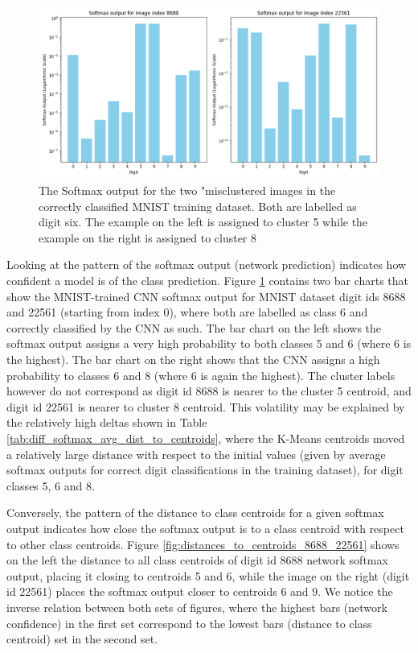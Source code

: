 \begin{figure}[H]
    \centering
    \includegraphics[width=0.99\columnwidth]{Figures/8688_22561_Softmax_Output.png}
    \caption{The Softmax output for the two "misclustered images in the correctly classified MNIST training dataset. Both are labelled as digit six. The example on the left is assigned to cluster 5 while the example on the right is assigned to cluster 8}
    \label{fig:8688_22561_Softmax_Output}
\end{figure}

Looking at the pattern of the softmax output (network prediction) 
indicates how confident a model is of the class prediction. Figure \ref{fig:8688_22561_Softmax_Output} contains two bar charts that show the MNIST-trained CNN softmax output for MNIST dataset digit ids 8688 and 22561 (starting from index 0), where both are labelled as class 6 and correctly classified by the CNN as such. The bar chart on the left shows the softmax output assigns a very high probability to both classes 5 and 6 (where 6 is the highest). The bar chart on the right shows that the CNN assigns a high probability to classes 6 and 8 (where 6 is again the highest). The cluster labels however do not correspond as digit id 8688 is nearer to the cluster 5 centroid, and digit id 22561 is nearer to cluster 8 centroid. This volatility may be explained by the relatively high deltas shown in Table \ref{tab:diff_softmax_avg_dist_to_centroids}, where the K-Means centroids moved a relatively large distance with respect to the initial values (given by average softmax outputs for correct digit classifications in the training dataset), for digit classes 5, 6 and 8. 

Conversely, the pattern of the distance to class centroids for a given softmax output 
indicates how close the softmax output is to a class centroid with respect to other class centroids. Figure \ref{fig:distances_to_centroids_8688_22561} shows on the left the distance to all class centroids of digit id 8688 network softmax output, placing it closing to centroids 5 and 6, while the image on the right (digit id 22561) places the softmax output closer to centroids 6 and 9. We notice the inverse relation between both sets of figures, where the highest bars (network confidence) in the first set correspond to the lowest bars (distance to class centroid) set in the second set.

